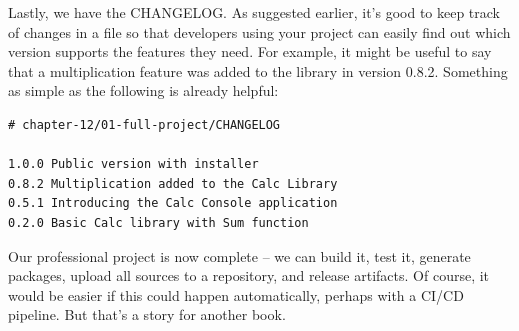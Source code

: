 Lastly, we have the CHANGELOG. As suggested earlier, it's good to keep track of changes in a file so that developers using your project can easily find out which version supports the features they need. For example, it might be useful to say that a multiplication feature was added to the library in version 0.8.2. Something as simple as the following is already helpful:

\begin{lstlisting}[style=stylePython]
# chapter-12/01-full-project/CHANGELOG

1.0.0 Public version with installer
0.8.2 Multiplication added to the Calc Library
0.5.1 Introducing the Calc Console application
0.2.0 Basic Calc library with Sum function
\end{lstlisting}

Our professional project is now complete – we can build it, test it, generate packages, upload all sources to a repository, and release artifacts. Of course, it would be easier if this could happen automatically, perhaps with a CI/CD pipeline. But that's a story for another book.












